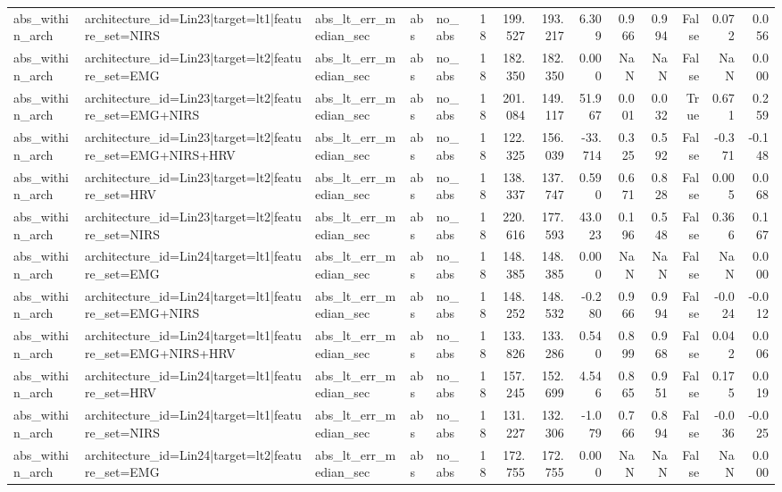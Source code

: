 \begin{table}
\begin{tabular}{lllllrrrrrrrrr}
abs_within_arch & architecture_id=Lin23|target=lt1|feature_set=NIRS & abs_lt_err_median_sec & abs & no_abs & 18 & 199.527 & 193.217 & 6.309 & 0.966 & 0.994 & False & 0.072 & 0.056 \\
abs_within_arch & architecture_id=Lin23|target=lt2|feature_set=EMG & abs_lt_err_median_sec & abs & no_abs & 18 & 182.350 & 182.350 & 0.000 & NaN & NaN & False & NaN & 0.000 \\
abs_within_arch & architecture_id=Lin23|target=lt2|feature_set=EMG+NIRS & abs_lt_err_median_sec & abs & no_abs & 18 & 201.084 & 149.117 & 51.967 & 0.001 & 0.032 & True & 0.671 & 0.259 \\
abs_within_arch & architecture_id=Lin23|target=lt2|feature_set=EMG+NIRS+HRV & abs_lt_err_median_sec & abs & no_abs & 18 & 122.325 & 156.039 & -33.714 & 0.325 & 0.592 & False & -0.371 & -0.148 \\
abs_within_arch & architecture_id=Lin23|target=lt2|feature_set=HRV & abs_lt_err_median_sec & abs & no_abs & 18 & 138.337 & 137.747 & 0.590 & 0.671 & 0.828 & False & 0.005 & 0.068 \\
abs_within_arch & architecture_id=Lin23|target=lt2|feature_set=NIRS & abs_lt_err_median_sec & abs & no_abs & 18 & 220.616 & 177.593 & 43.023 & 0.196 & 0.548 & False & 0.366 & 0.167 \\
abs_within_arch & architecture_id=Lin24|target=lt1|feature_set=EMG & abs_lt_err_median_sec & abs & no_abs & 18 & 148.385 & 148.385 & 0.000 & NaN & NaN & False & NaN & 0.000 \\
abs_within_arch & architecture_id=Lin24|target=lt1|feature_set=EMG+NIRS & abs_lt_err_median_sec & abs & no_abs & 18 & 148.252 & 148.532 & -0.280 & 0.966 & 0.994 & False & -0.024 & -0.012 \\
abs_within_arch & architecture_id=Lin24|target=lt1|feature_set=EMG+NIRS+HRV & abs_lt_err_median_sec & abs & no_abs & 18 & 133.826 & 133.286 & 0.540 & 0.899 & 0.968 & False & 0.042 & 0.006 \\
abs_within_arch & architecture_id=Lin24|target=lt1|feature_set=HRV & abs_lt_err_median_sec & abs & no_abs & 18 & 157.245 & 152.699 & 4.546 & 0.865 & 0.951 & False & 0.175 & 0.019 \\
abs_within_arch & architecture_id=Lin24|target=lt1|feature_set=NIRS & abs_lt_err_median_sec & abs & no_abs & 18 & 131.227 & 132.306 & -1.079 & 0.766 & 0.894 & False & -0.036 & -0.025 \\
abs_within_arch & architecture_id=Lin24|target=lt2|feature_set=EMG & abs_lt_err_median_sec & abs & no_abs & 18 & 172.755 & 172.755 & 0.000 & NaN & NaN & False & NaN & 0.000 \\

\end{tabular}
\end{table}
